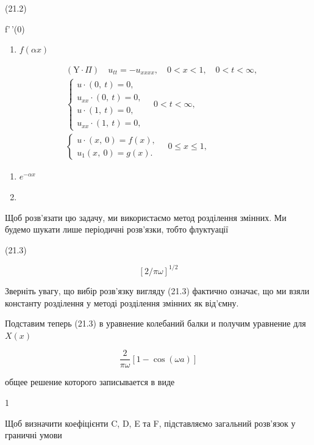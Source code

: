\documentclass[
  ukrainian,
]{article}
\providecommand{\tightlist}{%
  \setlength{\itemsep}{0pt}\setlength{\parskip}{0pt}}
\begin{document}
(21.2)

f'\,'(0)

\begin{enumerate}
\def\labelenumi{\arabic{enumi}.}
\setcounter{enumi}{1}
\tightlist
\item
  \(f(\alpha x)\)
\end{enumerate}

\[
\begin{aligned} & (\text{Y} \cdot \Pi) \quad u_{tt} = -u_{xxxx}, \quad 0 < x < 1, \quad 0 < t < \infty, \\ & \begin{cases} u \cdot (0, \ t) = 0, \\ u_{xx} \cdot (0, \ t) = 0, \\ u \cdot (1, \ t) = 0, \\ u_{xx} \cdot (1, \ t) = 0, \end{cases} \quad 0 < t < \infty, \\ & \begin{cases} u \cdot (x, \ 0) = f(x), \\ u_{1}(x, \ 0) = g(x). \end{cases} \quad 0 \leqslant x \leqslant 1, \end{aligned}
\]

\begin{enumerate}
\def\labelenumi{\arabic{enumi}.}
\setcounter{enumi}{2}
\item
  \(e^{-\alpha x}\)
\item
\end{enumerate}

Щоб розв'язати цю задачу, ми використаємо метод розділення змінних. Ми
будемо шукати лише періодичні розв'язки, тобто флуктуації

(21.3)

\[
[2/\pi\omega]^{1/2}
\]

Зверніть увагу, що вибір розв'язку вигляду (21.3) фактично означає, що
ми взяли константу розділення у методі розділення змінних як від'ємну.

Подставим теперь (21.3) в уравнение колебаний балки и получим уравнение
для \(X\left(x\right)\)

\[
\frac{2}{\pi\omega} [1-\cos(\omega a)]
\]

общее решение которого записывается в виде

1

Щоб визначити коефіцієнти C, D, E та F, підставляємо загальний розв'язок
у граничні умови
\end{document}
